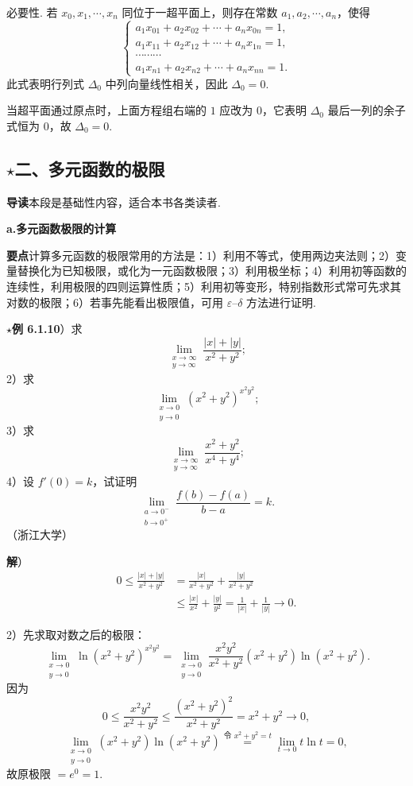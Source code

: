 \documentclass[UTF8, 12pt, fontset=fandol, oneside]{ctexart}
\begin{document}
必要性. 若 $x_0,x_1,\cdots,x_n$ 同位于一超平面上，则存在常数 $a_1,a_2,\cdots,a_n$，使得
\[
\begin{cases}
a_1x_{01}+a_2x_{02}+\cdots+a_nx_{0n}=1,\\
a_1x_{11}+a_2x_{12}+\cdots+a_nx_{1n}=1,\\
\cdots\cdots\cdots\\
a_1x_{n1}+a_2x_{n2}+\cdots+a_nx_{nn}=1.
\end{cases}
\]
此式表明行列式 $\Delta_0$ 中列向量线性相关，因此 $\Delta_0=0$.

当超平面通过原点时，上面方程组右端的 $1$ 应改为 $0$，它表明 $\Delta_0$ 最后一列的余子式恒为 $0$，故 $\Delta_0=0$.

\subsection*{$\star$二、多元函数的极限}

\noindent\textbf{导读}\quad 本段是基础性内容，适合本书各类读者.

\noindent\textbf{a.\quad 多元函数极限的计算}

\noindent\textbf{要点}\quad 计算多元函数的极限常用的方法是：1）利用不等式，使用两边夹法则；2）变量替换化为已知极限，或化为一元函数极限；3）利用极坐标；4）利用初等函数的连续性，利用极限的四则运算性质；5）利用初等变形，特别指数形式常可先求其对数的极限；6）若事先能看出极限值，可用 $\varepsilon$--$\delta$ 方法进行证明.

\noindent\textbf{$\star$例 6.1.10}）求
\[
  \lim_{\substack{x\to\infty\\ y\to\infty}}\frac{|x|+|y|}{x^2+y^2};
\]
2）求
\[
  \lim_{\substack{x\to0\\ y\to0}}(x^2+y^2)^{x^2y^2};
\]
3）求
\[
  \lim_{\substack{x\to\infty\\ y\to\infty}}\frac{x^2+y^2}{x^4+y^4};
\]
4）设 $f'(0)=k$，试证明
\[
  \lim_{\substack{a\to0^-\\ b\to0^+}}\frac{f(b)-f(a)}{b-a}=k.
\]
（浙江大学）

\noindent\textbf{解}）
\[
\begin{aligned}
0\le \frac{|x|+|y|}{x^2+y^2}
&=\frac{|x|}{x^2+y^2}+\frac{|y|}{x^2+y^2}\\
&\le \frac{|x|}{x^2}+\frac{|y|}{y^2}
=\frac1{|x|}+\frac1{|y|}\to0.
\end{aligned}
\]

2）先求取对数之后的极限：
\[
  \lim_{\substack{x\to0\\ y\to0}}\ln(x^2+y^2)^{x^2y^2}
  =\lim_{\substack{x\to0\\ y\to0}}
  \frac{x^2y^2}{x^2+y^2}(x^2+y^2)\ln(x^2+y^2).
\]
因为
\[
  0\le\frac{x^2y^2}{x^2+y^2}
  \le\frac{(x^2+y^2)^2}{x^2+y^2}
  =x^2+y^2\to0,
\]
\[
  \lim_{\substack{x\to0\\ y\to0}}(x^2+y^2)\ln(x^2+y^2)
  \stackrel{\text{令 }x^2+y^2=t}{=}
  \lim_{t\to0}t\ln t=0,
\]
故原极限 $=e^0=1$.
\end{document}

